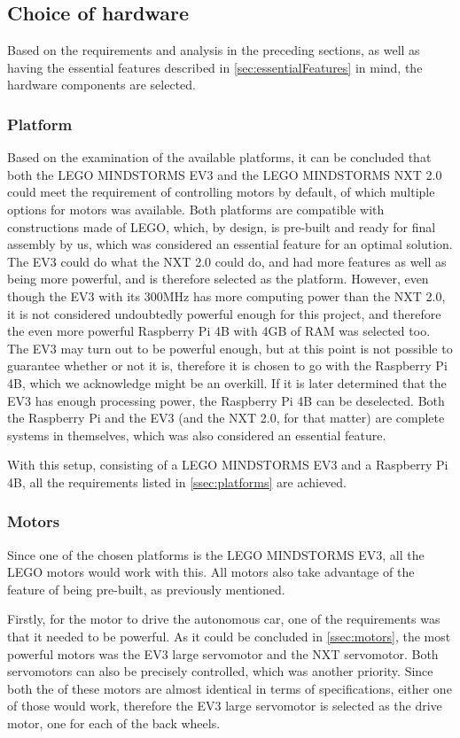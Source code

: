 \subsection{Choice of hardware}\label{ssec:choiceOfHardware}
Based on the requirements and analysis in the preceding sections, as well as having the essential features described in \autoref{sec:essentialFeatures} in mind, the hardware components are selected.

\subsubsection{Platform}
Based on the examination of the available platforms, it can be concluded that both the LEGO MINDSTORMS EV3 and the LEGO MINDSTORMS NXT 2.0 could meet the requirement of controlling motors by default, of which multiple options for motors was available.
Both platforms are compatible with constructions made of LEGO, which, by design, is pre-built and ready for final assembly by us, which was considered an essential feature for an optimal solution.
The EV3 could do what the NXT 2.0 could do, and had more features as well as being more powerful, and is therefore selected as the platform.
However, even though the EV3 with its 300MHz has more computing power than the NXT 2.0, it is not considered undoubtedly powerful enough for this project, and therefore the even more powerful Raspberry Pi 4B with 4GB of RAM was selected too.
The EV3 may turn out to be powerful enough, but at this point is not possible to guarantee whether or not it is, therefore it is chosen to go with the Raspberry Pi 4B, which we acknowledge might be an overkill.
If it is later determined that the EV3 has enough processing power, the Raspberry Pi 4B can be deselected.
Both the Raspberry Pi and the EV3 (and the NXT 2.0, for that matter) are complete systems in themselves, which was also considered an essential feature.

With this setup, consisting of a LEGO MINDSTORMS EV3 and a Raspberry Pi 4B, all the requirements listed in \autoref{ssec:platforms} are achieved.

\subsubsection{Motors}
Since one of the chosen platforms is the LEGO MINDSTORMS EV3, all the LEGO motors would work with this.
All motors also take advantage of the feature of being pre-built, as previously mentioned.

Firstly, for the motor to drive the autonomous car, one of the requirements was that it needed to be powerful.
As it could be concluded in \autoref{ssec:motors}, the most powerful motors was the EV3 large servomotor and the NXT servomotor.
Both servomotors can also be precisely controlled, which was another priority.
Since both the of these motors are almost identical in terms of specifications, either one of those would work, therefore the EV3 large servomotor is selected as the drive motor, one for each of the back wheels.

